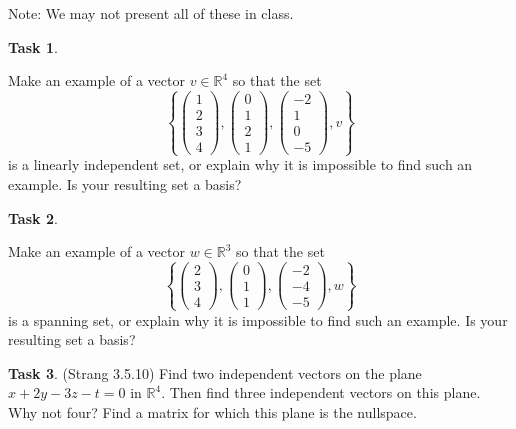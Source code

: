 \documentclass[10pt,]{book}
\theoremstyle{plain}
\theoremstyle{definition}
\numberwithin{equation}{section}
\newtheorem{task}{Task}[chapter]
\begin{document}
      Note: We may not present all of these in class.
\begin{task}
\label{task-108}

        Make an example of a vector \(v \in \mathbb{R}^4\) so that the set
        \[
          \left\{
          \begin{pmatrix} 1 \\ 2 \\ 3 \\ 4 \end{pmatrix},
          \begin{pmatrix} 0 \\ 1 \\ 2 \\ 1 \end{pmatrix},
          \begin{pmatrix} -2\\ 1 \\ 0 \\ -5 \end{pmatrix},
          v
          \right\}
        \]
        is a linearly independent set, or explain why it is impossible to find
        such an example.
        Is your resulting set a basis?
      \end{task}
\begin{task}
\label{task-109}

        Make an example of a vector \(w \in \mathbb{R}^3\) so that the set
        \[
          \left\{
          \begin{pmatrix} 2 \\ 3 \\ 4 \end{pmatrix},
          \begin{pmatrix} 0 \\ 1 \\ 1 \end{pmatrix},
          \begin{pmatrix} -2\\ -4 \\ -5 \end{pmatrix},
          w
          \right\}
        \]
        is a spanning set, or explain why it is impossible to find such an
        example. Is your resulting set a basis?
      \end{task}
\begin{task}
\label{task-110}
(Strang 3.5.10)
        Find two independent vectors on the plane \(x+2y-3z-t=0\) in
        \(\mathbb{R}^4\). Then find three independent vectors on this plane.
        Why not four? Find a matrix for which this plane is the nullspace.
      \end{task}
\end{document}
